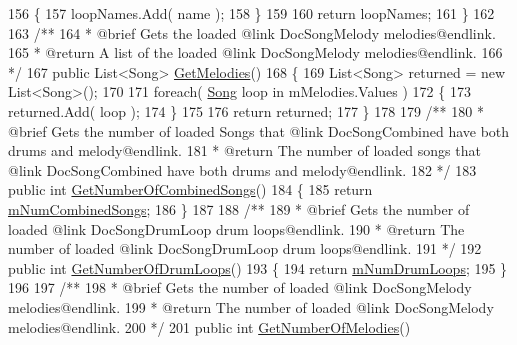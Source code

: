 \begin{DoxyCodeInclude}
156         \{
157             loopNames.Add( name );
158         \}
159 
160         \textcolor{keywordflow}{return} loopNames;
161     \}
162 \textcolor{comment}{}
163 \textcolor{comment}{    /**}
164 \textcolor{comment}{     * @brief Gets the loaded @link DocSongMelody melodies@endlink.}
165 \textcolor{comment}{     * @return A list of the loaded @link DocSongMelody melodies@endlink.}
166 \textcolor{comment}{    */}
167     \textcolor{keyword}{public} List<Song> \hyperlink{group___s_m_pub_func_ga7d46ab1949725dd7c3c00ac3975916fe}{GetMelodies}()
168     \{
169         List<Song> returned = \textcolor{keyword}{new} List<Song>();
170 
171         \textcolor{keywordflow}{foreach}( \hyperlink{class_song}{Song} loop \textcolor{keywordflow}{in} mMelodies.Values )
172         \{
173             returned.Add( loop );
174         \}
175 
176         \textcolor{keywordflow}{return} returned;
177     \}
178 \textcolor{comment}{}
179 \textcolor{comment}{    /**}
180 \textcolor{comment}{     * @brief Gets the number of loaded Songs that @link DocSongCombined have both drums and
       melody@endlink.}
181 \textcolor{comment}{     * @return The number of loaded songs that @link DocSongCombined have both drums and melody@endlink.}
182 \textcolor{comment}{    */}
183     \textcolor{keyword}{public} \textcolor{keywordtype}{int} \hyperlink{group___s_m_pub_func_gac41e94dbaa3f2db83a6d86466526f76c}{GetNumberOfCombinedSongs}()
184     \{
185         \textcolor{keywordflow}{return} \hyperlink{group___s_m_priv_var_gae423c7b9efd0e2ef721820318200e5f9}{mNumCombinedSongs};
186     \}
187 \textcolor{comment}{}
188 \textcolor{comment}{    /**}
189 \textcolor{comment}{     * @brief Gets the number of loaded @link DocSongDrumLoop drum loops@endlink.}
190 \textcolor{comment}{     * @return The number of loaded @link DocSongDrumLoop drum loops@endlink.}
191 \textcolor{comment}{    */}
192     \textcolor{keyword}{public} \textcolor{keywordtype}{int} \hyperlink{group___s_m_pub_func_ga97d32492e08ca62787088888e78589b7}{GetNumberOfDrumLoops}()
193     \{
194         \textcolor{keywordflow}{return} \hyperlink{group___s_m_priv_var_ga0ea9b6c8343a9b2cbe0eb375edaef247}{mNumDrumLoops};
195     \}
196 \textcolor{comment}{}
197 \textcolor{comment}{    /** }
198 \textcolor{comment}{     * @brief Gets the number of loaded @link DocSongMelody melodies@endlink.}
199 \textcolor{comment}{     * @return The number of loaded @link DocSongMelody melodies@endlink.}
200 \textcolor{comment}{    */}
201     \textcolor{keyword}{public} \textcolor{keywordtype}{int} \hyperlink{group___s_m_pub_func_gae1d2222909f1d9a1f761591c7154f42c}{GetNumberOfMelodies}()

\end{DoxyCodeInclude}

